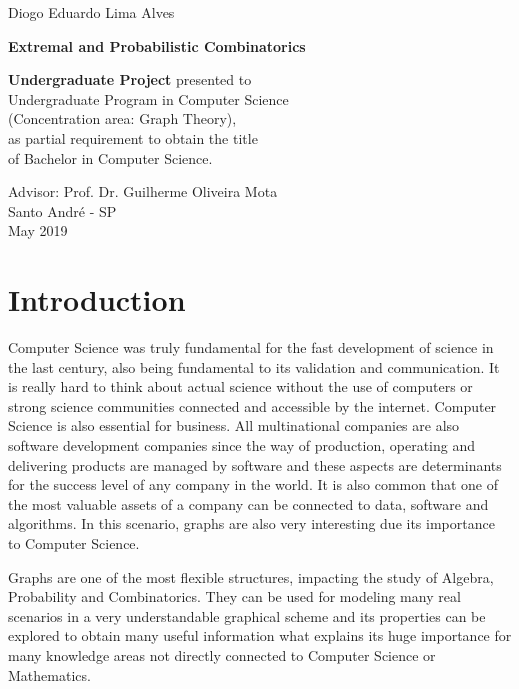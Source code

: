 \documentclass[12pt,twoside,a4paper,bibliography=totocnumbered]{book}
\numberwithin{equation}{section}
\theoremstyle{remark}
\begin{document}
\newpage
\begin{center}
Diogo Eduardo Lima Alves
\end{center}
   \begin{center}
        \vspace*{4 cm}
        \textbf{\Large{Extremal and Probabilistic Combinatorics}}\\
        \vspace*{5cm}
    \end{center}

    \begin{flushright}
{\bf Undergraduate Project} presented to\\ 
Undergraduate Program in Computer Science\\ 
(Concentration area: Graph Theory),\\ 
as partial requirement to obtain the title\\ 
of Bachelor in Computer Science.
    \end{flushright}

\vspace{3cm}
\begin{center}
Advisor: Prof. Dr. Guilherme Oliveira Mota\\
\vfill
Santo André - SP\\
May 2019
\end{center}

\tableofcontents

\listoffigures

\chapter{Introduction}
Computer Science was truly fundamental for the fast development of science in the last century, also being fundamental to its validation and communication. It is really hard to think about actual science without the use of computers or strong science communities connected and accessible by the internet. Computer Science is also essential for business. All multinational companies are also software development companies since the way of production, operating and delivering products are managed by software and these aspects are determinants for the success level of any company in the world. It is also common that one of the most valuable assets of a company can be connected to data, software and algorithms. In this scenario, graphs are also very interesting due its importance to Computer Science.

Graphs are one of the most flexible structures, impacting the study of Algebra, Probability and Combinatorics. They can be used for modeling many real scenarios in a very understandable graphical scheme and its properties can be explored to obtain many useful information what explains its huge importance for many knowledge areas not directly connected to Computer Science or Mathematics.   
\end{document}
